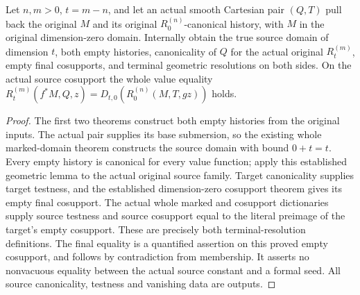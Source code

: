 \begin{theorem}
\label{hir:smooth-original-zero-family-history}
\leanok
{}
Let $n,m>0$, $t=m-n$, and let an actual smooth Cartesian pair $(Q,T)$
pull back the original $M$ and its original $R^{(n)}_0$-canonical history,
with $M$ in the original dimension-zero domain. Internally obtain the true
source domain of dimension $t$, both empty histories, canonicality of $Q$
for the actual original $R^{(m)}_t$, empty final cosupports, and terminal
geometric resolutions on both sides. On the actual source cosupport the
whole value equality $R^{(m)}_t(f^*M,Q,z)=D_{t,0}(R^{(n)}_0(M,T,gz))$
holds.
\end{theorem}
\begin{proof}
The first two theorems construct both empty histories from the original
inputs. The actual pair supplies its base submersion, so the existing
whole marked-domain theorem constructs the source domain with bound
$0+t=t$. Every empty history is canonical for every value function; apply
this established geometric lemma to the actual original source family.
Target canonicality supplies target testness, and the established
dimension-zero cosupport theorem gives its empty final cosupport. The
actual whole marked and cosupport dictionaries supply source testness
and source cosupport equal to the literal preimage of the target's empty
cosupport. These are precisely both terminal-resolution definitions.
The final equality is a quantified assertion on this proved empty
cosupport, and follows by contradiction from membership. It asserts no
nonvacuous equality between the actual source constant and a formal seed.
All source canonicality, testness and vanishing data are outputs.
\end{proof}

